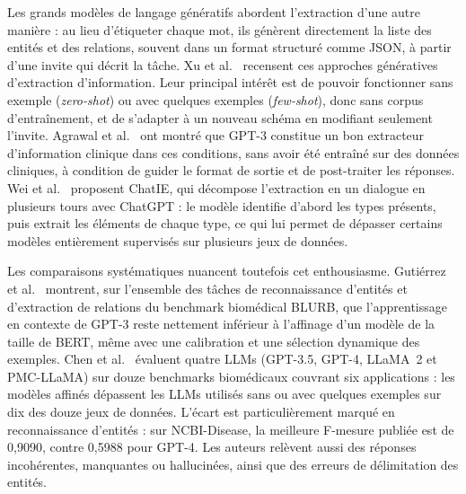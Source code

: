 Les grands modèles de langage génératifs abordent l'extraction d'une autre manière : au lieu d'étiqueter chaque mot, ils génèrent directement la liste des entités et des relations, souvent dans un format structuré comme JSON, à partir d'une invite qui décrit la tâche. Xu et al.~\cite{xu2024genie_survey} recensent ces approches génératives d'extraction d'information. Leur principal intérêt est de pouvoir fonctionner sans exemple (\textit{zero-shot}) ou avec quelques exemples (\textit{few-shot}), donc sans corpus d'entraînement, et de s'adapter à un nouveau schéma en modifiant seulement l'invite. Agrawal et al.~\cite{agrawal2022fewshot} ont montré que GPT-3 constitue un bon extracteur d'information clinique dans ces conditions, sans avoir été entraîné sur des données cliniques, à condition de guider le format de sortie et de post-traiter les réponses. Wei et al.~\cite{wei2023chatie} proposent ChatIE, qui décompose l'extraction en un dialogue en plusieurs tours avec ChatGPT : le modèle identifie d'abord les types présents, puis extrait les éléments de chaque type, ce qui lui permet de dépasser certains modèles entièrement supervisés sur plusieurs jeux de données.

Les comparaisons systématiques nuancent toutefois cet enthousiasme. Gutiérrez et al.~\cite{gutierrez2022gpt3bioie} montrent, sur l'ensemble des tâches de reconnaissance d'entités et d'extraction de relations du benchmark biomédical BLURB, que l'apprentissage en contexte de GPT-3 reste nettement inférieur à l'affinage d'un modèle de la taille de BERT, même avec une calibration et une sélection dynamique des exemples. Chen et al.~\cite{chen2025benchmarking} évaluent quatre LLMs (GPT-3.5, GPT-4, LLaMA~2 et PMC-LLaMA) sur douze benchmarks biomédicaux couvrant six applications : les modèles affinés dépassent les LLMs utilisés sans ou avec quelques exemples sur dix des douze jeux de données. L'écart est particulièrement marqué en reconnaissance d'entités : sur NCBI-Disease, la meilleure F-mesure publiée est de 0,9090, contre 0,5988 pour GPT-4. Les auteurs relèvent aussi des réponses incohérentes, manquantes ou hallucinées, ainsi que des erreurs de délimitation des entités.

